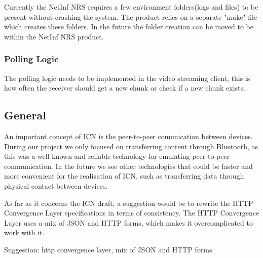 Currently the NetInf NRS requires a few environment folders(logs and files) to be present without crashing the system. The product relies on a separate "make" file which creates these folders. In the future the folder creation can be moved to be within the NetInf NRS product.

\subsubsection{Polling Logic}

The polling logic needs to be implemented in the video streaming client, this is how often the receiver should get a new chunk or check if a new chunk exists.  

\subsection{General}

An important concept of ICN is the peer-to-peer comunication between devices. 
During our project we only focused on transferring content
through Bluetooth, as this was a well known and reliable technology for emulating peer-to-peer communication.
In the future we see other technologies that could be faster and more convenient for the realization of ICN,
such as transferring data through physical contact between devices.

As far as it concerns the ICN draft, a suggestion would be to rewrite the HTTP Convergence Layer specifications
in terms of consistency. The HTTP Convergence Layer uses a mix of JSON and HTTP forms, which makes it
overcomplicated to work with it. 





Suggestion: http convergence layer, mix of JSON and HTTP forms
